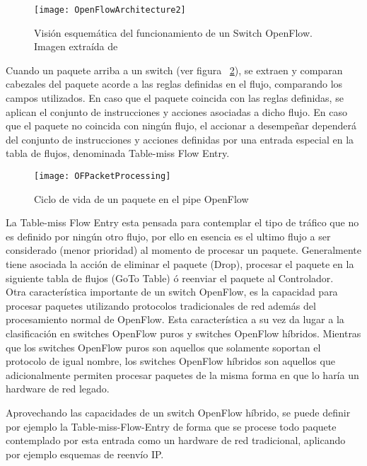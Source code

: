 \begin{figure}[htbp!] 
\centering    
\texttt{[image: OpenFlowArchitecture2]}
\caption[Visión esquemática del funcionamiento de un Switch OpenFlow]{Visión esquemática del funcionamiento de un Switch OpenFlow. Imagen extraída de \cite{mckeown2008openflow}}
\label{fig:OpenFlowArch2}
\end{figure}

Cuando un paquete arriba a un switch (ver figura ~\ref{fig:OFPacketProcessing}), se extraen y comparan cabezales del paquete acorde a las reglas definidas en el flujo, comparando los campos utilizados. En caso que el paquete coincida con las reglas definidas, se aplican el conjunto de instrucciones y acciones asociadas a dicho flujo. En caso que el paquete no coincida con ningún flujo, el accionar a desempeñar dependerá del conjunto de instrucciones y acciones definidas por una entrada especial en la tabla de flujos, denominada Table-miss Flow Entry.\\ 

\begin{figure}[htbp!] 
\centering    
\texttt{[image: OFPacketProcessing]}
\caption[Ciclo de vida de un paquete en pipe OpenFlow]{Ciclo de vida de un paquete en el pipe OpenFlow}
\label{fig:OFPacketProcessing}
\end{figure}


La Table-miss Flow Entry esta pensada para contemplar el tipo de tr\'afico que no es definido por ningún otro flujo, por ello en esencia es el ultimo flujo a ser considerado (menor prioridad) al momento de procesar un paquete. Generalmente tiene asociada la acción de eliminar el paquete (Drop), procesar el paquete en la siguiente tabla de flujos (GoTo Table) \'o reenviar el paquete al Controlador.\\

Otra caracter\'istica importante de un switch OpenFlow, es la capacidad para procesar paquetes utilizando protocolos tradicionales de red adem\'as del procesamiento normal de OpenFlow. Esta característica a su vez da lugar a la clasificaci\'on en switches OpenFlow puros y switches OpenFlow h\'ibridos. Mientras que los switches OpenFlow puros son aquellos que solamente soportan el protocolo de igual nombre, los switches OpenFlow h\'ibridos son aquellos que adicionalmente permiten procesar paquetes de la misma forma en que lo har\'ia un hardware de red legado.

Aprovechando las capacidades de un switch OpenFlow h\'ibrido, se puede definir por ejemplo la Table-miss-Flow-Entry de forma que se procese todo paquete contemplado por esta entrada como un hardware de red tradicional, aplicando por ejemplo esquemas de reenvío IP. 

